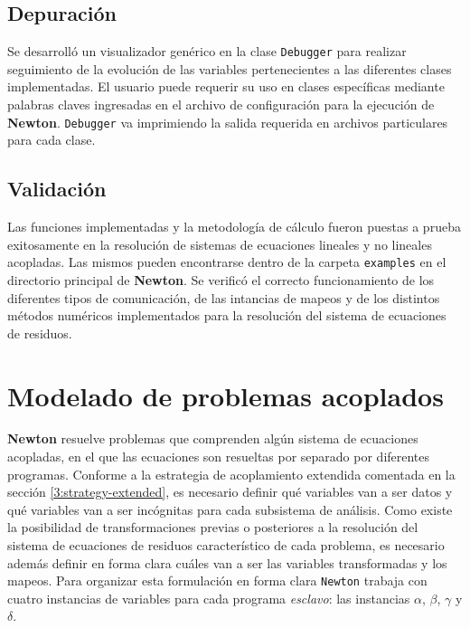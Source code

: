 \subsection*{Depuración}
\label{ap2:debug}

Se desarrolló un visualizador genérico en la clase \texttt{Debugger} para realizar seguimiento de la evolución de las variables pertenecientes a las diferentes clases implementadas.
El usuario puede requerir su uso en clases específicas mediante palabras claves ingresadas en el archivo de configuración para la ejecución de \textbf{Newton}.
\texttt{Debugger} va imprimiendo la salida requerida en archivos particulares para cada clase.

\subsection*{Validación}
\label{ap2:bench}

Las funciones implementadas y la metodología de cálculo fueron puestas a prueba exitosamente en la resolución de sistemas de ecuaciones lineales y no lineales acopladas.
Las mismos pueden encontrarse dentro de la carpeta \texttt{examples} en el directorio principal de \textbf{Newton}.
Se verificó el correcto funcionamiento de los diferentes tipos de comunicación, de las intancias de mapeos y de los distintos métodos numéricos implementados para la resolución del sistema de ecuaciones de residuos.

\section{Modelado de problemas acoplados}
\label{ap1:definicion}

\textbf{Newton} resuelve problemas que comprenden algún sistema de ecuaciones acopladas, en el que las ecuaciones son resueltas por separado por diferentes programas.
Conforme a la estrategia de acoplamiento extendida comentada en la sección \ref{3:strategy-extended}, 
es necesario definir qué variables van a ser datos y qué variables van a ser incógnitas para cada subsistema de análisis.
Como existe la posibilidad de transformaciones previas o posteriores a la resolución del sistema de ecuaciones de residuos característico de cada problema,
es necesario además definir en forma clara cuáles van a ser las variables transformadas y los mapeos.
Para organizar esta formulación en forma clara \texttt{Newton} trabaja con cuatro instancias de variables para cada programa \textit{esclavo}:
las instancias $\alpha$, $\beta$, $\gamma$ y $\delta$.

